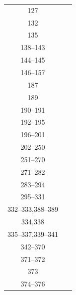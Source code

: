 \begin{center}
\begin{tabular}{ | c | c |}
        127 &~\cite{isol_novel_HERV_HC2_like_elem_human_chr,xpress_phyl_analyses_HERV_HC2_belong_HERV_T_human_cancer} \\
        132 &~\cite{seq_var_HERV_ERV9_env_immunosupressive_peptide} \\
        135 &~\cite{id_diff_xpress_HERV_fam_leukemia_lymphoma} \\
        138--143 &~\cite{tert_activ_erv_prom_immunosupress_tumour} \\
        144--145 &~\cite{novel_CSF1_transloc_HERV_elem_in_tumor} \\
        146--157 &~\cite{postparser_HERV_browser} \\
        187 &~\cite{human_L1_retrotransposon_encodes_conserved_EN} \\
        189 &~\cite{technique_gw_id_difi_rep_int_between_rel_genom, activ_HERVK_impl_melanoma_cell_malignant} \\
        190--191 &~\cite{genom_wide_comp_diff_integration_sites_IR,technique_gw_id_difi_rep_int_between_rel_genom} \\
        192--195 &~\cite{high_polymorphism_genom_seq_flank_RE_insert_loci} \\
        196--201 &~\cite{reading_between_the_LINEs_genom_var_L1} \\
        202--250 &~\cite{human_specific_hervk_insert_genom_var} \\
        251--270 &~\cite{dist_insert_polymorphic_ERV_breast_cancer} \\
        271--282 &~\cite{promoter_expression_HML2_relation_LTR_var_polymorphism} \\
        283--294 &~\cite{var_proviral_content_human_genom_by_LTR_recomb} \\
        295--331 &~\cite{technique_gw_id_difi_rep_int_between_rel_genom} \\
        332--333,388--389 &~\cite{id_char_comp_HML2} \\
        334,338 &~\cite{Insert_polymorphims_HERV,insert_polymorph_K113_K115_breast_cancer} \\
        335--337,339--341 &~\cite{insert_polymorph_K113_K115_breast_cancer} \\
        342--370 &~\cite{unfixed_ERV_insert_human_pop} \\
        371--372 &~\cite{id_assoss_lung_cancer_novel_insert_polymorph_HERV} \\
        373 &~\cite{rare_event_insert_polymorph_HERV_K_LTR_human_genom} \\
        374--376 &~\cite{dist_HERV_K113_K115_health_disease,herv_k113_not_assoss_MS_large_family_based_study} \\

\end{tabular}
\end{center}
